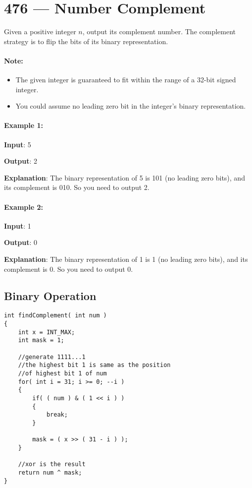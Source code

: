 \section{476 --- Number Complement}
Given a positive integer $n$, output its complement number. The complement strategy is to flip the bits of its binary representation.

\paragraph{Note:}
\begin{itemize}
\item The given integer is guaranteed to fit within the range of a 32-bit signed integer.
\item You could assume no leading zero bit in the integer’s binary representation.
\end{itemize}

\paragraph{Example 1:}
\begin{flushleft}
\textbf{Input}: 5

\textbf{Output}: 2

\textbf{Explanation}: The binary representation of 5 is 101 (no leading zero bits), and its complement is 010. So you need to output 2.
\end{flushleft}

\paragraph{Example 2:}
\begin{flushleft}
\textbf{Input}: 1

\textbf{Output}: 0

\textbf{Explanation}: The binary representation of 1 is 1 (no leading zero bits), and its complement is 0. So you need to output 0.
\end{flushleft}

\subsection{Binary Operation}

\setcounter{lstlisting}{0}
\begin{lstlisting}[style=customc, caption={Binary Operation}]
int findComplement( int num )
{
    int x = INT_MAX;
    int mask = 1;

    //generate 1111...1
    //the highest bit 1 is same as the position
    //of highest bit 1 of num
    for( int i = 31; i >= 0; --i )
    {
        if( ( num ) & ( 1 << i ) )
        {
            break;
        }

        mask = ( x >> ( 31 - i ) );
    }

    //xor is the result
    return num ^ mask;
}
\end{lstlisting}